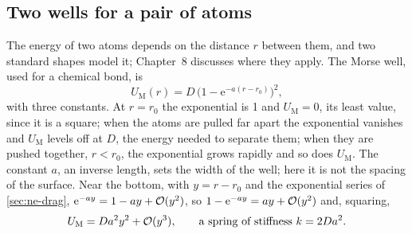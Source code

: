 \subsection*{Two wells for a pair of atoms}

The energy of two atoms depends on the distance $r$ between them, and two
standard shapes model it; Chapter~8 discusses where they apply. The Morse
well, used for a chemical bond, is
\begin{equation*}
   U_{\mathrm{M}}(r) = D\,\bigl(1 - \mathrm{e}^{-a(r - r_0)}\bigr)^2 ,
\end{equation*}
with three constants. At $r = r_0$ the exponential is 1 and $U_{\mathrm M}
= 0$, its least value, since it is a square; when the atoms are pulled
far apart the exponential vanishes and $U_{\mathrm M}$ levels off at $D$,
the energy needed to separate them; when they are pushed together,
$r < r_0$, the exponential grows rapidly and so does $U_{\mathrm M}$. The
constant $a$, an inverse length, sets the width of the well; here it is
not the spacing of the surface. Near the bottom, with $y = r - r_0$ and
the exponential series of \cref{sec:ne-drag}, $\mathrm{e}^{-ay} = 1 - ay +
\mathcal{O}(y^2)$, so $1 - \mathrm{e}^{-ay} = ay + \mathcal{O}(y^2)$ and, squaring,
\begin{equation*}
   U_{\mathrm M} = D a^2 y^2 + \mathcal{O}(y^3) ,
   \qquad\text{a spring of stiffness } k = 2Da^2 .
\end{equation*}

